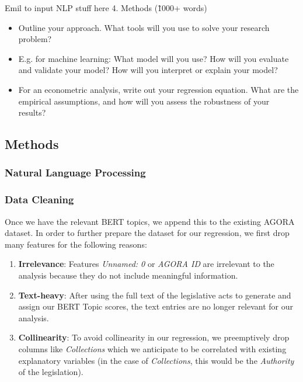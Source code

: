 \documentclass{article}
\begin{document}
Emil to input NLP stuff here
4. Methods (\~1000+ words)

\begin{itemize}
    \item Outline your approach. What tools will you use to solve your research problem?
    \item E.g. for machine learning: What model will you use? How will you evaluate and validate your model? How will you interpret or explain your model? 
    \item For an econometric analysis, write out your regression equation. What are the empirical assumptions, and how will you assess the robustness of your results?
\end{itemize}
\subsection{Methods}
\subsubsection{Natural Language Processing}
\subsubsection{Data Cleaning}

Once we have the relevant BERT topics, we append this to the existing AGORA dataset. In order to further prepare the dataset for our regression, we first drop many features for the following reasons: 
\begin{adjustwidth}{2em}{0em}
\begin{enumerate}
    \item \textbf{Irrelevance}: Features \textit{Unnamed: 0} or \textit{AGORA ID} are irrelevant to the analysis because they do not include meaningful information.
    \item \textbf{Text-heavy}: After using the full text of the legislative acts to generate and assign our BERT Topic scores, the text entries are no longer relevant for our analysis.
    \item \textbf{Collinearity}: To avoid collinearity in our regression, we preemptively drop columns like \textit{Collections} which we anticipate to be correlated with existing explanatory variables (in the case of \textit{Collections}, this would be the \textit{Authority} of the legislation).
\end{enumerate}
\end{adjustwidth}
\end{document}
